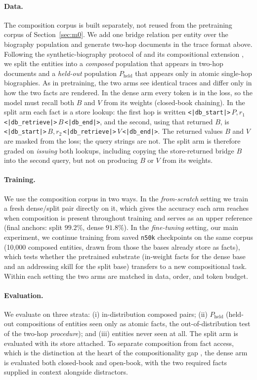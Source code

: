 \documentclass{article}
\begin{document}
\paragraph{Data.} The composition corpus is built separately, not reused from the pretraining corpus of Section~\ref{sec:m0}. We add one bridge relation per entity over the biography population and generate two-hop documents in the trace format above. Following the synthetic-biography protocol of \citet{allenzhu2023manipulation} and its compositional extension \citep{karmim2026multihop}, we split the entities into a \emph{composed} population that appears in two-hop documents and a \emph{held-out} population $P_{\text{held}}$ that appears only in atomic single-hop biographies. As in pretraining, the two arms see identical traces and differ only in how the two facts are rendered. In the dense arm every token is in the loss, so the model must recall both $B$ and $V$ from its weights (closed-book chaining). In the split arm each fact is a store lookup: the first hop is written \texttt{<|db\_start|>}\,$P, r_1$\,\texttt{<|db\_retrieve|>}\,$B$\,\texttt{<|db\_end|>}, and the second, using that returned $B$, is \texttt{<|db\_start|>}\,$B, r_2$\,\texttt{<|db\_retrieve|>}\,$V$\,\texttt{<|db\_end|>}. The returned values $B$ and $V$ are masked from the loss; the query strings are not. The split arm is therefore graded on \emph{issuing} both lookups, including copying the store-returned bridge $B$ into the second query, but not on producing $B$ or $V$ from its weights.

\paragraph{Training.} We use the composition corpus in two ways. In the \emph{from-scratch} setting we train a fresh dense/split pair directly on it, which gives the accuracy each arm reaches when composition is present throughout training and serves as an upper reference (final anchors: split $99.2\%$, dense $91.8\%$). In the \emph{fine-tuning} setting, our main experiment, we continue training from saved \texttt{n50k} checkpoints on the same corpus (10{,}000 composed entities, drawn from those the bases already store as facts), which tests whether the pretrained substrate (in-weight facts for the dense base and an addressing skill for the split base) transfers to a new compositional task. Within each setting the two arms are matched in data, order, and token budget.

\paragraph{Evaluation.} We evaluate on three strata: (i) in-distribution composed pairs; (ii) $P_{\text{held}}$ (held-out compositions of entities seen only as atomic facts, the out-of-distribution test of the two-hop \emph{procedure}); and (iii) entities never seen at all. The split arm is evaluated with its store attached. To separate composition from fact access, which is the distinction at the heart of the compositionality gap \citep{press2023compgap}, the dense arm is evaluated both closed-book and open-book, with the two required facts supplied in context alongside distractors.
\end{document}
